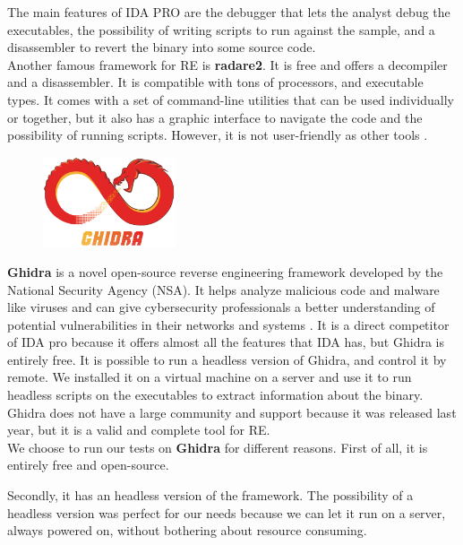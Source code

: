 The main features of IDA PRO are the debugger that lets the analyst debug the executables, the possibility of writing scripts to run against the sample, and a disassembler to revert the binary into some source code. \cite{ida}\\


Another famous framework for RE is \textbf{radare2}. It is free and offers a decompiler and a disassembler.  It is compatible with tons of processors, and executable types. It comes with a set of command-line utilities that can be used individually or together, but it also has a graphic interface to navigate the code and the possibility of running scripts. However, it is not user-friendly as other tools \cite{radare2}.\\

\begin{figure}
	\centering
	\includegraphics[width=0.35\textwidth]{ghidra}
	
\end{figure}

\textbf{Ghidra} is a novel open-source reverse engineering framework developed by the National Security Agency (NSA). It helps analyze malicious code and malware like viruses and can give cybersecurity professionals a better understanding of potential vulnerabilities in their networks and systems \cite{ghidra}. It is a direct competitor of IDA pro because it offers almost all the features that IDA has, but Ghidra is entirely free. It is possible to run a headless version of Ghidra, and control it by remote. We installed it on a virtual machine on a server and use it to run headless scripts on the executables to extract information about the binary.
Ghidra does not have a large community and support because it was released last year, but it is a valid and complete tool for RE. 
\\

We choose to run our tests on \textbf{Ghidra} for different reasons. First of all, it is entirely free and open-source. 

Secondly, it has an headless version of the framework. The possibility of a headless version was perfect for our needs because we can let it run on a server, always powered on, without bothering about resource consuming. 

